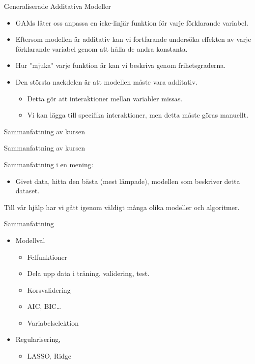 \documentclass[10pt,english]{beamer}
\begin{document}
\begin{frame}{Generaliserade Additativa Modeller}
    
    \begin{itemize}
        \item GAMs låter oss anpassa en icke-linjär funktion för varje förklarande variabel.
        \item Eftersom modellen är additativ kan vi fortfarande undersöka effekten av varje förklarande variabel genom att hålla de andra konstanta.
        \item Hur "mjuka" varje funktion är kan vi beskriva genom frihetsgraderna. 
        \item Den största nackdelen är att modellen måste vara additativ.
        \begin{itemize}
            \item Detta gör att interaktioner mellan variabler missas.
            \item Vi kan lägga till specifika interaktioner, men detta måste göras manuellt.
        \end{itemize}
    \end{itemize}

\end{frame}

\begin{frame}[standout]
    \Huge Sammanfattning av kursen
\end{frame}

\begin{frame}{Sammanfattning av kursen}

    Sammanfattning i en mening:
    \begin{itemize}
        \item Givet data, hitta den bästa (mest lämpade), modellen som beskriver detta dataset.
    \end{itemize}

    Till vår hjälp har vi gått igenom väldigt många olika modeller och algoritmer.
    
\end{frame}

\begin{frame}{Sammanfattning}
    \begin{itemize}
        \item Modellval
        \begin{itemize}
            \item Felfunktioner
            \item Dela upp data i träning, validering, test.
            \item Korsvalidering
            \item AIC, BIC\dots
            \item Variabelselektion
        \end{itemize}
        \item Regularisering,
        \begin{itemize}
            \item LASSO, Ridge
        \end{itemize}
    \end{itemize}
\end{frame}
\end{document}
